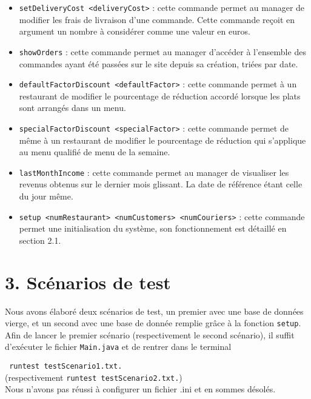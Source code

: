 \begin{itemize}
    \item \texttt{setDeliveryCost <deliveryCost>} : cette commande permet au manager de modifier les frais de livraison d'une commande. Cette commande reçoit en argument un nombre à considérer comme une valeur en euros. \\
    \item \texttt{showOrders} : cette commande permet au manager d'accéder à l'ensemble des commandes ayant été passées sur le site depuis sa création, triées par date.\\
    \item \texttt{defaultFactorDiscount <defaultFactor>} : cette commande permet à un restaurant de modifier le pourcentage de réduction accordé lorsque les plats sont arrangés dans un menu. \\
    \item \texttt{specialFactorDiscount <specialFactor>} : cette commande permet de même à un restaurant de modifier le pourcentage de réduction qui s'applique au menu qualifié de menu de la semaine. \\
    \item \texttt{lastMonthIncome} : cette commande permet au manager de visualiser les revenus obtenus sur le dernier mois glissant. La date de référence étant celle du jour même. \\
    \item \texttt{setup <numRestaurant> <numCustomers> <numCouriers>} : cette commande permet une initialisation du système, son fonctionnement est détaillé en section 2.1.
\end{itemize}

\section*{3. Scénarios de test}

Nous avons élaboré deux scénarios de test, un premier avec une base de données vierge, et un second avec une base de donnée remplie grâce à la fonction \texttt{setup}.\\

Afin de lancer le premier scénario (respectivement le second scénario), il suffit d'exécuter le fichier \texttt{Main.java} et de rentrer dans le terminal 

\texttt{
runtest testScenario1.txt.}\\ (respectivement \texttt{runtest testScenario2.txt.})\\

Nous n'avons pas réussi à configurer un fichier .ini et en sommes désolés.

